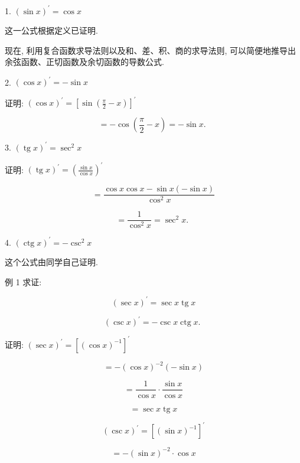 \documentclass[lang=cn,newtx,10pt,scheme=chinese]{elegantbook}
\begin{document}
\begin{conclusion}
	1. \({\left( \sin x\right) }^{\prime } = \cos x\)
\end{conclusion}
这一公式根据定义已证明.

现在, 利用复合函数求导法则以及和、差、积、商的求导法则, 可以简便地推导出余弦函数、正切函数及余切函数的导数公式.
\begin{conclusion}
	2. \({\left( \cos x\right) }^{\prime } = - \sin x\)
\end{conclusion}

证明: \({\left( \cos x\right) }^{\prime } = {\left\lbrack \sin \left( \frac{\pi }{2} - x\right) \right\rbrack }^{\prime }\)

\[
= - \cos \left( {\frac{\pi }{2} - x}\right) = - \sin x\text{. }
\]

\begin{conclusion}
	3. \({\left( \operatorname{tg}x\right) }^{\prime } = {\sec }^{2}x\)
\end{conclusion}

证明: \({\left( \operatorname{tg}x\right) }^{\prime } = {\left( \frac{\sin x}{\cos x}\right) }^{\prime }\)

\[
= \frac{\cos x\cos x - \sin x\left( {-\sin x}\right) }{{\cos }^{2}x}
\]

\[
= \frac{1}{{\cos }^{2}x} = {\sec }^{2}x\text{. }
\]

\begin{conclusion}
	4. \({\left( \operatorname{ctg}x\right) }^{\prime } = - {\csc }^{2}x\)
\end{conclusion}

这个公式由同学自己证明.

例 1 求证:

\[
{\left( \sec x\right) }^{\prime } = \sec x\operatorname{tg}x
\]

\[
{\left( \csc x\right) }^{\prime } = - \csc x\operatorname{ctg}x\text{. }
\]

证明: \({\left( \sec x\right) }^{\prime } = {\left\lbrack {\left( \cos x\right) }^{-1}\right\rbrack }^{\prime }\)

\[
= - {\left( \cos x\right) }^{-2}\left( {-\sin x}\right)
\]

\[
= \frac{1}{\cos x} \cdot \frac{\sin x}{\cos x}
\]

\[
= \sec x\operatorname{tg}x
\]

\[
{\left( \csc x\right) }^{\prime } = {\left\lbrack {\left( \sin x\right) }^{-1}\right\rbrack }^{\prime }
\]

\[
= - {\left( \sin x\right) }^{-2} \cdot \cos x
\]
\end{document}
